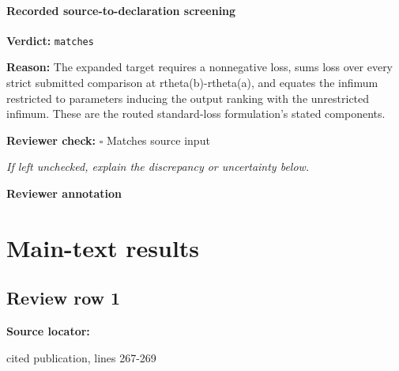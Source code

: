 \documentclass[10pt]{article}
\newcommand{\reviewerbox}{%
  \par\noindent\fbox{\parbox{0.96\linewidth}{\rule{0pt}{0.38in}}}\par
}
\newcommand{\reviewmatch}[1]{%
  \par\noindent\textbf{Reviewer check:} $\square$\; #1\par
  \noindent\emph{If left unchecked, explain the discrepancy or uncertainty below.}\par
}
\begin{document}
\paragraph{Recorded source-to-declaration screening}
\textbf{Verdict:} \texttt{matches}
\\
{\raggedright
\textbf{Reason:} The expanded target requires a nonnegative loss, sums loss over every strict submitted comparison at rtheta(b)-\allowbreak{}rtheta(a), and equates the infimum restricted to parameters inducing the output ranking with the unrestricted infimum.\allowbreak{} These are the routed standard-\allowbreak{}loss formulation's stated components.\allowbreak{}
\par}
\reviewmatch{Matches source input}
\noindent\textbf{Reviewer annotation}\par
\reviewerbox

\clearpage
\hypertarget{source-claim-eb42e4a359411adb}{}
\hypertarget{source-section-a2cb018f24443c81}{}
\section*{Main-text results}
\subsection*{Review row 1}
\textbf{Source locator:} {\footnotesize\raggedright cited publication, lines 267-\allowbreak{}269\par}
\end{document}
